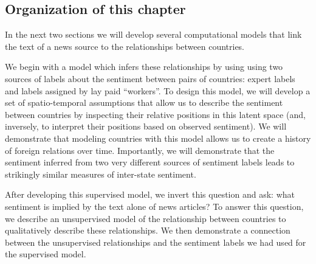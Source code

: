 
\subsection*{Organization of this chapter}

In the next two sections we will develop several computational models that
link the text of a news source to the relationships between countries.

We begin with a model which infers these relationships by using using
two sources of labels about the sentiment between pairs of countries:
expert labels and labels assigned by lay paid ``workers''.  To design
this model, we will develop a set of spatio-temporal assumptions that
allow us to describe the sentiment between countries by inspecting
their relative positions in this latent space (and, inversely, to
interpret their positions based on observed sentiment).  We will
demonstrate that modeling countries with this model allows us to
create a history of foreign relations over time.  Importantly, we will
demonstrate that the sentiment inferred from two very different
sources of sentiment labels leads to strikingly similar measures of inter-state
sentiment.

After developing this supervised model, we invert this question and
ask: what sentiment is implied by the text alone of news articles?  To
answer this question, we describe an unsupervised model of the
relationship between countries to qualitatively describe these
relationships.  We then demonstrate a connection between the
unsupervised relationships and the sentiment labels we had used for
the supervised model.
